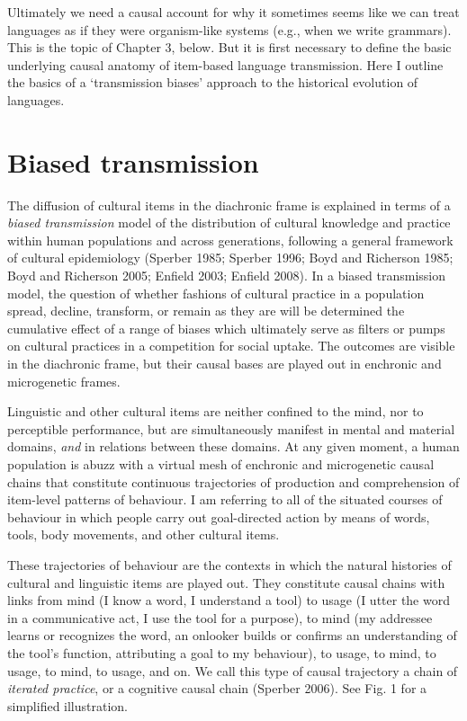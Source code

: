 Ultimately we need a causal account for why it sometimes seems like we 
can treat languages as if they were organism-like systems (e.g., when we 
write grammars). This is the topic of Chapter 3, below. But it is first 
necessary to define the basic underlying causal anatomy of item-based 
language transmission. Here I outline the basics of a \textquoteleft transmission 
biases' approach to the historical evolution of languages. 



\section{Biased transmission}


The diffusion of cultural items in the diachronic frame is explained in terms of a \textit{biased transmission} model of the distribution of cultural knowledge 
and practice within human populations and across generations, following 
a general framework of cultural epidemiology (Sperber 1985; Sperber 
1996; Boyd and Richerson 1985; Boyd and Richerson 2005; Enfield 2003; 
Enfield 2008). In a biased transmission model, the question of whether 
fashions of cultural practice in a population spread, decline, 
transform, or remain as they are will be determined the cumulative 
effect of a range of biases which ultimately serve as filters or pumps 
on cultural practices in a competition for social uptake. The outcomes are visible in the diachronic frame, but their causal bases are played out in enchronic and microgenetic frames.



Linguistic and other cultural items are neither confined to the mind, nor to 
perceptible performance, but are simultaneously manifest in mental and 
material domains, \textit{and} in relations between these domains. At 
any given moment, a human population is abuzz with a virtual mesh of 
enchronic and microgenetic causal chains that constitute continuous trajectories of 
production and comprehension of item-level patterns of behaviour. I am 
referring to all of the situated courses of behaviour in which people 
carry out goal-directed action by means of words, tools, body movements, 
and other cultural items. 



These trajectories of behaviour are the contexts in which the natural 
histories of cultural and linguistic items are played out. They 
constitute causal chains with links from mind (I know a word, I 
understand a tool) to usage (I utter the word in a communicative act, I 
use the tool for a purpose), to mind (my addressee learns or recognizes 
the word, an onlooker builds or confirms an understanding of the tool's 
function, attributing a goal to my behaviour), to usage, to mind, to 
usage, to mind, to usage, and on. We call this type of causal 
trajectory a chain of \textit{iterated practice}, or a cognitive 
causal chain (Sperber 2006). See Fig. 1 for a simplified illustration.





